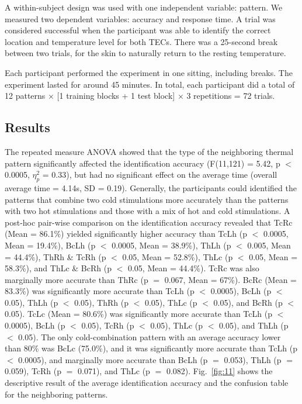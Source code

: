 \documentclass[preprint,12pt]{elsarticle}
\begin{document}

A within-subject design was used with one independent variable: pattern. We measured two dependent variables: accuracy and response time. A trial was considered successful when the participant was able to identify the correct location and temperature level for both TECs. There was a 25-second break between two trials, for the skin to naturally return to the resting temperature.

Each participant performed the experiment in one sitting, including breaks. The experiment lasted for around 45 minutes. In total, each participant did a total of 12 patterns $\times$ [1 training blocks + 1 test block] $\times$ 3 repetitions = 72 trials.

\subsection{Results}
The repeated measure ANOVA showed that the type of the neighboring thermal pattern significantly affected the identification accuracy (F(11,121) = 5.42, p $<$ 0.0005, $\eta_p^2$ = 0.33), but had no significant effect on the average time (overall average time = 4.14s, SD = 0.19). Generally, the participants could identified the patterns that combine two cold stimulations more accurately than the patterns with two hot stimulations and those with a mix of hot and cold stimulations. A post-hoc pair-wise comparison on the identification accuracy revealed that TcRc (Mean = 86.1\%) yielded significantly higher accuracy than TcLh (p $<$ 0.0005, Mean = 19.4\%), BcLh (p $<$ 0.0005, Mean = 38.9\%), ThLh (p $<$ 0.005, Mean = 44.4\%), ThRh \& TcRh (p $<$ 0.05, Mean = 52.8\%), ThLc (p $<$ 0.05, Mean = 58.3\%), and ThLc \& BcRh (p $<$ 0.05, Mean = 44.4\%). TcRc was also marginally more accurate than ThRc (p $=$ 0.067, Mean = 67\%). BcRc (Mean = 83.3\%) was significantly more accurate than TcLh (p $<$ 0.0005), BcLh (p $<$ 0.05), ThLh (p $<$ 0.05), ThRh (p $<$ 0.05), ThLc (p $<$ 0.05), and BcRh (p $<$ 0.05). TcLc (Mean = 80.6\%) was significantly more accurate than TcLh (p $<$ 0.0005), BcLh (p $<$ 0.05), TcRh (p $<$ 0.05), ThLc (p $<$ 0.05), and ThLh (p $<$ 0.05). The only cold-combination pattern with an average accuracy lower than 80\% was BcLc (75.0\%), and it was significantly more accurate than TcLh (p $<$ 0.0005), and marginally more accurate than BcLh (p $=$ 0.053), ThLh (p $=$ 0.059), TcRh (p $=$ 0.071), and ThLc (p $=$ 0.082). Fig.~\ref{fig:11} shows the descriptive result of the average identification accuracy and the confusion table for the neighboring patterns.
\end{document}

